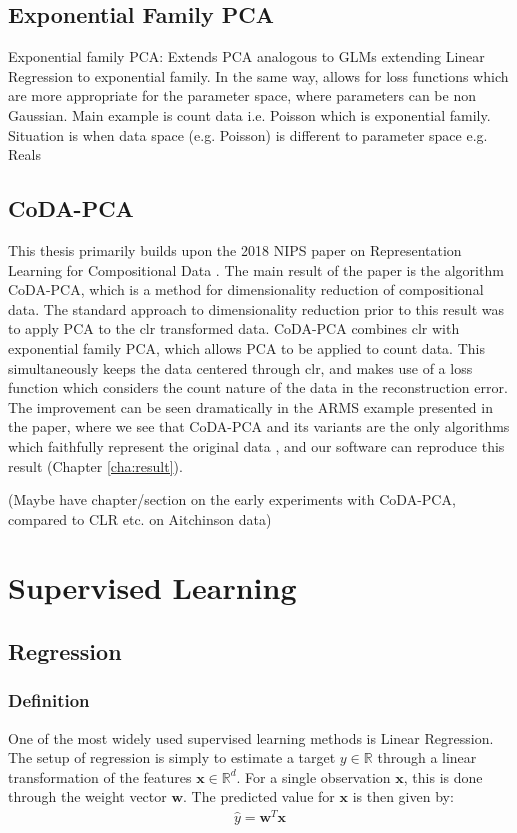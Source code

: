 \subsection{Exponential Family PCA}
Exponential family PCA: Extends PCA analogous to GLMs extending Linear Regression to exponential family. In the same way, allows for loss functions which are more appropriate for the parameter space, where parameters can be non Gaussian. Main example is count data i.e. Poisson which is exponential family. Situation is when data space (e.g. Poisson) is different to parameter space e.g. Reals

\subsection{CoDA-PCA}
\label{codapca}
This thesis primarily builds upon the 2018 NIPS paper on Representation Learning for Compositional Data \citep{Avalos2018}. The main result of the paper is the algorithm CoDA-PCA, which is a method for dimensionality reduction of compositional data. The standard approach to dimensionality reduction prior to this result was to apply PCA to the clr transformed data. CoDA-PCA combines clr with exponential family PCA, which allows PCA to be applied to count data. This simultaneously keeps the data centered through clr, and makes use of a loss function which considers the count nature of the data in the reconstruction error. The improvement can be seen dramatically in the ARMS example presented in the paper, where we see that CoDA-PCA and its variants are the only algorithms which faithfully represent the original data \citep{Avalos2018}, and our software can reproduce this result (Chapter \ref{cha:result}).     



 

(Maybe have chapter/section on the early experiments with CoDA-PCA, compared to CLR etc. on Aitchinson data)


\section{Supervised Learning}
\label{sec:sup}


\subsection{Regression}
\subsubsection{Definition}
One of the most widely used supervised learning methods is Linear Regression. The setup of regression is simply to estimate a target $y \in \mathbb{R}$ through a linear transformation of the features $\mathbf{x} \in \mathbb{R}^{d}$. For a single observation $\mathbf{x}$, this is done through the weight vector $\mathbf{w}$. The predicted value for $\mathbf{x}$ is then given by:
\begin{align}
    \hat{y} = \mathbf{w}^T\mathbf{x}
\end{align}

